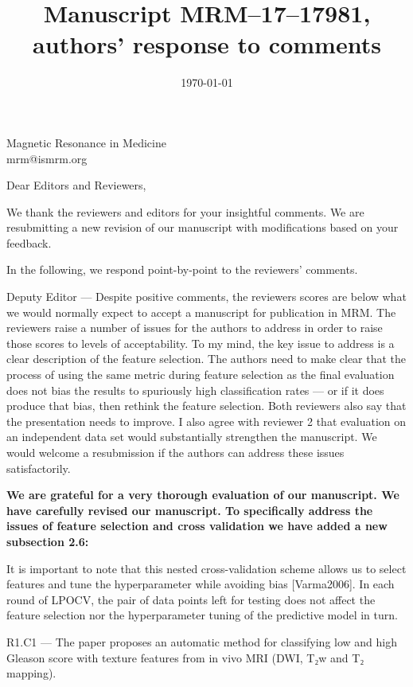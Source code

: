 \documentclass{letter}
\title{Manuscript MRM--17--17981, authors' response to comments}
\date{\today}
\newenvironment{comment}[1]%
  {\vspace{5ex}\par\textsf{#1 ---} \ignorespaces}%
  {\par\ignorespacesafterend}
\newenvironment{reply}%
  {\vspace{2ex}\par\bfseries}%
  {\par\upshape}
\providecommand{\citep}[1]{[#1]}
\begin{document}
\begin{letter}{Magnetic Resonance in Medicine \\ mrm@ismrm.org}
\opening{Dear Editors and Reviewers,}

We thank the reviewers and editors for your insightful comments. We are
resubmitting a new revision of our manuscript with modifications based on your
feedback.


In the following, we respond point-by-point to the reviewers' comments.



\begin{comment}{Deputy Editor}
Despite positive comments, the reviewers scores are below what we would normally
expect to accept a manuscript for publication in MRM\@. The reviewers raise a
number of issues for the authors to address in order to raise those scores to
levels of acceptability. To my mind, the key issue to address is a clear
description of the feature selection. The authors need to make clear that the
process of using the same metric during feature selection as the final
evaluation does not bias the results to spuriously high classification rates ---
or if it does produce that bias, then rethink the feature selection. Both
reviewers also say that the presentation needs to improve. I also agree with
reviewer 2 that evaluation on an independent data set would substantially
strengthen the manuscript. We would welcome a resubmission if the authors can
address these issues satisfactorily.
\end{comment}

\begin{reply}
We are grateful for a very thorough evaluation of our manuscript. We have
carefully revised our manuscript. To specifically address the issues of feature
selection and cross validation we have added a new subsection 2.6:

It is important to note that this nested cross-validation scheme allows us to
select features and tune the hyperparameter while avoiding bias
\citep{Varma2006}. In each round of LPOCV, the pair of data points left for
testing does not affect the feature selection nor the hyperparameter tuning of
the predictive model in turn.
\end{reply}




\begin{comment}{R1.C1}
The paper proposes an automatic method for classifying low and high Gleason
score with texture features from in vivo MRI (DWI, T₂w and T₂ mapping).


\end{comment}
\end{letter}
\end{document}
